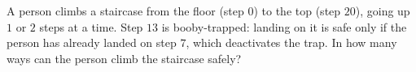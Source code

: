 A person climbs a staircase from the floor (step $0$) to the top (step $20$), going up $1$ or $2$ steps at a time. Step $13$ is booby-trapped: landing on it is safe only if the person has already landed on step $7$, which deactivates the trap. In how many ways can the person climb the staircase safely?
